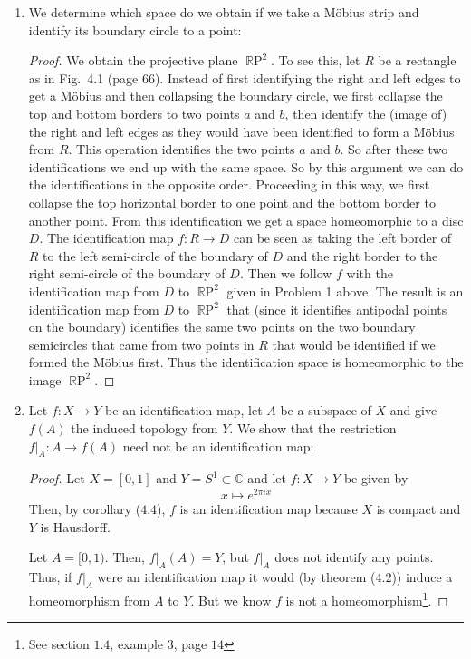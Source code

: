 \documentclass{book}
\DeclareMathOperator*{\R}{\mathbb{R}}
\DeclareMathOperator*{\RP}{\R\text{P}}
\begin{document}
\begin{enumerate}[(1)]
    \item We determine which space do we obtain if we take a M\"obius strip and identify its boundary circle to a point: 
        \begin{proof} We obtain the projective plane $\RP^2$.  To see this, let $R$ be a rectangle as in Fig.\ 4.1 (page 66).  Instead of first identifying the right and left edges to get a M\"obius and then collapsing the boundary circle, we first collapse the top and bottom borders to two points $a$ and $b$, then identify the (image of) the right and left edges as they would have been identified to form a M\"obius from $R$.  This operation identifies the two points $a$ and $b$.  So after these two identifications we end up with the same space.  So by this argument we can do the identifications in the opposite order.   Proceeding in this way, we first collapse the top horizontal border to one point and the bottom border to another point.  From this identification we get a space homeomorphic to a disc $D$.  The identification map $f:R\rightarrow D$ can be seen as taking the left border of $R$ to the left semi-circle of the boundary of $D$ and the right border to the right semi-circle of the boundary of $D$.  Then we follow $f$ with the identification map from $D$ to $\RP^2$ given in Problem 1 above.  The result is an identification map from $D$ to $\RP^2$ that (since it identifies antipodal points on the boundary) identifies the same two points on the two boundary semicircles that came from two points in $R$ that would be identified if we formed the M\"obius first.  Thus the identification space is homeomorphic to the image $\RP^2$.
        \end{proof}

    \item Let $f:X\rightarrow Y$ be an identification map, let $A$ be a subspace of $X$ and give $f(A)$ the induced topology from $Y$. We show that the restriction $f|_A:A\rightarrow f(A)$ need not be an identification map: 
        \begin{proof} Let $X=[0,1]$ and $Y=S^1\subset \mathbb C$ and let $f:X\rightarrow Y$ be given by 
            \[ x\mapsto e^{2\pi i x}\]
            Then, by corollary ($4.4$), $f$ is an identification map because $X$ is compact and $Y$ is Hausdorff.  
            \par Let $A=[0,1)$. Then, $f|_A(A)=Y$, but $f|_A$ does not identify any points.  Thus, if $f|_A$ were an identification map it would (by theorem ($4.2$)) induce a homeomorphism from $A$ to $Y$. But we know $f$ is not a homeomorphism\footnote{See section $1.4$, example $3$, page $14$}.
        \end{proof}


\end{enumerate}
\end{document}

